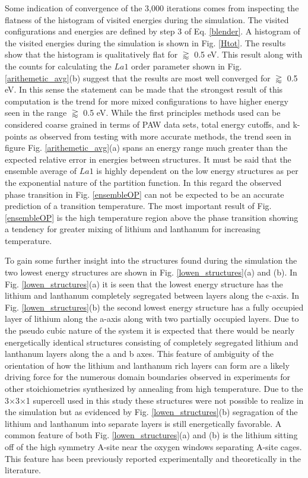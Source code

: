 \documentclass[aps,pre,reprint,superscriptaddress,showkeys]{revtex4-1}
\begin{document}
Some indication of convergence of the 3,000 iterations comes from inspecting the flatness of the histogram of visited energies during the simulation. The visited configurations and energies are defined by step 3 of Eq. \ref{blender}. A histogram of the visited energies during the simulation is shown in Fig. \ref{Htot}. The results show that  the histogram is qualitatively flat for $\gtrapprox $ 0.5 eV. This result along with the counts for calculating the $La1$ order parameter shown in Fig. \ref{arithemetic_avg}(b) suggest that the results are most well converged for $\gtrapprox $ 0.5 eV. In this sense the statement can be made that the strongest result of this computation is the trend for more mixed configurations to have higher energy seen in the range $\gtrapprox $ 0.5 eV. While the first principles methods used can be considered coarse grained in terms of PAW data sets, total energy cutoffs, and k-points as observed from testing with more accurate methods, the trend seen in figure Fig. \ref{arithemetic_avg}(a) spans an energy range much greater than the expected relative error in energies between structures. It must be said that the ensemble average of $La1$ is highly dependent on the low energy structures as per the exponential nature of the partition function. In this regard the observed phase transition in Fig. \ref{ensembleOP} can not be expected to be an accurate prediction of a transition temperature. The most important result of Fig. \ref{ensembleOP} is the high temperature region above the phase transition showing a tendency for greater mixing of lithium and lanthanum for increasing temperature. 

To gain some further insight into the structures found during the simulation the two lowest energy structures are  shown in  Fig. \ref{lowen_structures}(a) and (b). In Fig. \ref{lowen_structures}(a) it is seen that the lowest energy structure has the lithium and lanthanum completely segregated between layers along the c-axis. In Fig. \ref{lowen_structures}(b)  the second lowest energy structure has a fully occupied layer of lithium along the a-axis along with two partially occupied layers.  Due to the pseudo cubic nature of the system it is expected that there would be nearly energetically identical structures  consisting of completely segregated lithium and lanthanum layers along the a and b axes. This feature of ambiguity of the orientation of how the lithium and lanthanum rich layers can form  are a likely driving force for the numerous domain boundaries observed in experiments for other stoichiometries synthesized by annealing from high temperature\cite{imaginary_phonons,domainboundaries}. Due to the 3$\times$3$\times$1 supercell used in this study these structures were not possible to realize in the simulation but as evidenced by Fig. \ref{lowen_structures}(b) segragation of the lithium and lanthanum into separate layers is still energetically favorable. A common feature of both Fig. \ref{lowen_structures}(a) and (b) is the lithium sitting off of the high symmetry A-site near the oxygen windows separating A-site cages. This feature has been previously reported experimentally and theoretically in the literature\cite{Asitedistribution,imaginary_phonons,Li_La_ordering_computational,lithiumpos}. 
\\
\end{document}
